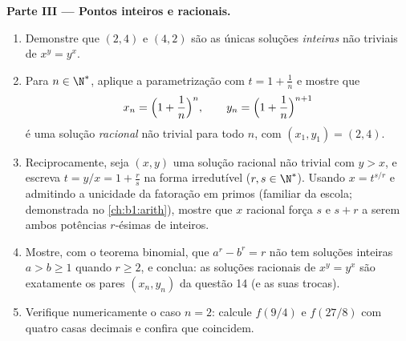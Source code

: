 \begin{problem}
\medskip
\noindent\textbf{Parte III --- Pontos inteiros e racionais.}
\begin{enumerate}
  \item Demonstre que $(2, 4)$ e $(4, 2)$ são as únicas soluções
        \emph{inteiras} não triviais de $x^y = y^x$.
  \item Para $n \in \N^*$, aplique a parametrização com $t = 1 +
        \frac1n$ e mostre que
        \[
        x_n = \Bigl(1 + \frac1n\Bigr)^{n},
        \qquad
        y_n = \Bigl(1 + \frac1n\Bigr)^{n+1}
        \]
        é uma solução \emph{racional} não trivial para todo $n$,
        com $(x_1, y_1) = (2, 4)$.
  \item Reciprocamente, seja $(x, y)$ uma solução racional não trivial
        com $y > x$, e escreva $t = y/x = 1 + \frac rs$ na forma
        irredutível ($r, s \in \N^*$). Usando $x = t^{s/r}$ e admitindo
        a unicidade da fatoração em primos (familiar da
        escola; demonstrada no \cref{ch:b1:arith}), mostre que $x$
        racional força $s$ e $s + r$ a serem ambos potências $r$-ésimas
        de inteiros.
  \item Mostre, com o teorema binomial, que $a^r - b^r = r$ não tem
        soluções inteiras $a > b \geq 1$ quando $r \geq 2$, e
        conclua: as soluções racionais de $x^y = y^x$ são
        exatamente os pares $(x_n, y_n)$ da questão 14 (e as suas
        trocas).
  \item Verifique numericamente o caso $n = 2$: calcule $f(9/4)$ e
        $f(27/8)$ com quatro casas decimais e confira que coincidem.
\end{enumerate}


\end{problem}
